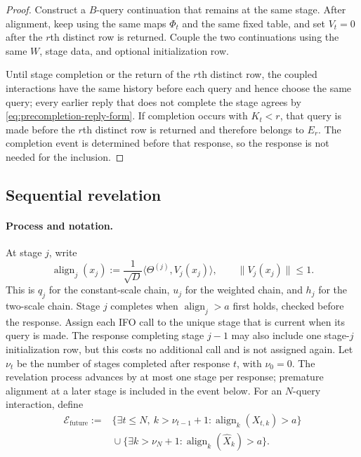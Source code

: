 \documentclass{article}
\theoremstyle{definition}
\newcommand{\cEfuture}{\mathcal{E}_{\mathrm{future}}}
\begin{document}
\begin{proof}
Construct a $B$-query continuation that remains at the same stage.  After
alignment, keep using the same maps $\Phi_t$ and the same fixed table, and set
$V_t=0$ after the $r$th distinct row is returned.  Couple the two
continuations using the same $W$, stage data, and optional initialization row.

Until stage completion or the return of the $r$th distinct row, the coupled
interactions have the same history before each query and hence choose the same
query; every earlier reply that does not complete the stage agrees by
\eqref{eq:precompletion-reply-form}.  If completion occurs with $K_t<r$, that
query is made before the $r$th distinct row is returned and therefore belongs
to $E_r$.  The completion event is determined before that response, so the
response is not needed for the inclusion.
\end{proof}

\subsection{Sequential revelation}

\paragraph{Process and notation.}
At stage $j$, write
\begin{equation}
 \operatorname{align}_j(x_j):=\frac1{\sqrt D}
 \langle\Theta^{(j)},V_j(x_j)\rangle,
 \qquad \|V_j(x_j)\|\le1.
 \label{eq:generic-radial-alignment}
\end{equation}
This is $q_j$ for the constant-scale chain, $u_j$ for the weighted chain, and
$h_j$ for the two-scale chain.  Stage $j$ completes when $\operatorname{align}_j>a$ first
holds, checked before the response.
Assign each IFO call to the unique stage that is current when its query is
made.  The response completing stage $j-1$ may also include one stage-$j$
initialization row, but this costs no additional call and is not assigned again.
Let $\nu_t$ be the number of stages completed after response $t$, with
$\nu_0=0$.  The revelation process advances by at most one stage per response;
premature alignment at a later stage is included in the event below.
For an $N$-query interaction, define
\begin{equation}
\begin{aligned}
 \cEfuture
 :={}&\{\exists t\le N,\ k>\nu_{t-1}+1:
       \operatorname{align}_k(X_{t,k})>a\}\\
 &{}\cup\{\exists k>\nu_N+1:
       \operatorname{align}_k(\widehat X_k)>a\}.
\end{aligned}
\label{eq:future-alignment-event}
\end{equation}
\end{document}
